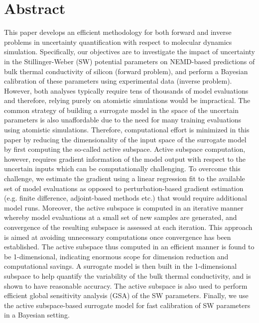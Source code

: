 \section*{Abstract}
This paper develops an efficient methodology for both forward and inverse 
problems in uncertainty quantification with respect to molecular dynamics simulation.
Specifically, our objectives are to investigate the impact of uncertainty in the
Stillinger-Weber (SW) potential parameters on NEMD-based predictions of bulk
thermal conductivity of silicon (forward problem), and perform a Bayesian calibration
of these parameters using experimental data (inverse problem). 
However, both analyses typically require tens of thousands of model evaluations
and therefore, relying purely on atomistic simulations would be impractical.
The common strategy of building a surrogate model in the space of the uncertain
parameters is also unaffordable due to the need for many training evaluations
using atomistic simulations. Therefore, computational effort 
is minimized in this paper by reducing the
dimensionality of the input space of the surrogate model by first computing
the so-called active subspace.
Active subspace computation, however, requires gradient information of
the model output with respect to the uncertain inputs which can be
computationally challenging. To overcome this challenge, we estimate the
gradient using a linear regression fit to the available set of
model evaluations as opposed to perturbation-based gradient estimation
(e.g. finite difference, adjoint-based methods etc.) 
that would require additional model runs. Moreover, 
the active subspace is computed in an iterative manner whereby model
evaluations at a small set of new samples are generated, and convergence
of the resulting subspace is assessed at each iteration. This approach is
aimed at  avoiding unnecessary computations once convergence has been
established.
The active subspace thus computed in an efficient manner is found to be
1-dimensional, indicating enormous scope for dimension reduction and
computational savings. A surrogate model is 
then built in the 1-dimensional subspace to help quantify
the variability of the bulk thermal conductivity, and is shown to have
reasonable accuracy. The
active subspace is also used to perform efficient global sensitivity analysis (GSA)
of the SW parameters. Finally, we use the active subspace-based
surrogate model for fast calibration of SW parameters in a Bayesian setting.  
